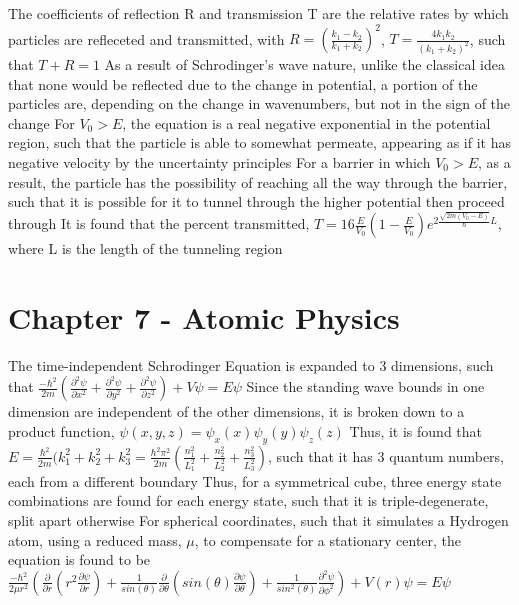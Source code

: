 \documentclass[11 pt, twoside]{article}
\newenvironment{outline*}
{
	\begin{outline}[enumerate]
	}
	{\end{outline}
}
\begin{document}
\begin{outline*}
		\3 The coefficients of reflection R and transmission T are the relative rates by which particles are refleceted and transmitted, with $R = (\frac{k_1 - k_2}{k_1 + k_2})^2$, $T = \frac{4k_1k_2}{(k_1 + k_2)^2}$, such that $T + R = 1$
	\2 As a result of Schrodinger's wave nature, unlike the classical idea that none would be reflected due to the change in potential, a portion of the particles are, depending on the change in wavenumbers, but not in the sign of the change
	\2 For $V_0 > E$, the equation is a real negative exponential in the potential region, such that the particle is able to somewhat permeate, appearing as if it has negative velocity by the uncertainty principles
	\2 For a barrier in which $V_0 > E$, as a result, the particle has the possibility of reaching all the way through the barrier, such that it is possible for it to tunnel through the higher potential then proceed through
		\3 It is found that the percent transmitted, $T = 16\frac{E}{V_0}(1 - \frac{E}{V_0})e^{2\frac{\sqrt{2m(V_0 - E)}}{\hbar}L}$, where L is the length of the tunneling region
\end{outline*}
\section{Chapter 7 - Atomic Physics}
\begin{outline*}
\1 The time-independent Schrodinger Equation is expanded to 3 dimensions, such that $\frac{-\hbar^2}{2m}(\frac{\partial^2 \psi}{\partial x^2} + \frac{\partial^2 \psi}{\partial y^2} + \frac{\partial^2 \psi}{\partial z^2}) + V\psi = E\psi$
	\2 Since the standing wave bounds in one dimension are independent of the other dimensions, it is broken down to a product function, $\psi(x, y, z) = \psi_x(x)\psi_y(y)\psi_z(z)$
		\3 Thus, it is found that $E = \frac{\hbar^2}{2m}(k_1^2 + k_2^2 + k_3^2 = \frac{\hbar^2\pi^2}{2m}(\frac{n_1^2}{L_1^2} + \frac{n_2^2}{L_2^2} + \frac{n_3^2}{L_3^2})$, such that it has 3 quantum numbers, each from a different boundary
	\2 Thus, for a symmetrical cube, three energy state combinations are found for each energy state, such that it is triple-degenerate, split apart otherwise
	\2 For spherical coordinates, such that it simulates a Hydrogen atom, using a reduced mass, $\mu$, to compensate for a stationary center, the equation is found to be $\frac{-\hbar^2}{2\mu r^2}(\frac{\partial}{\partial r}(r^2 \frac{\partial \psi}{\partial r}) + \frac{1}{sin(\theta)}\frac{\partial}{\partial \theta}(sin(\theta)\frac{\partial \psi}{\partial \theta}) + \frac{1}{sin^2(\theta)}\frac{\partial^2 \psi}{\partial \phi^2}) + V(r)\psi = E\psi$
\end{outline*}
\end{document}
